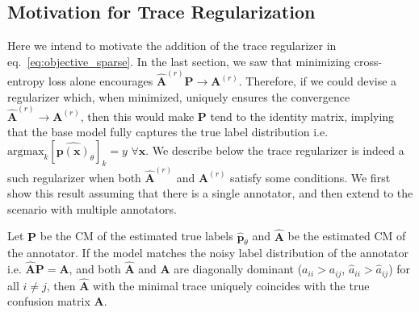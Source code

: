 \subsection{Motivation for Trace Regularization}\label{sec:theorems}
Here we intend to motivate the addition of the trace regularizer in eq.~\ref{eq:objective_sparse}. In the last section, we saw that minimizing cross-entropy loss alone encourages $\hat{\textbf{A}}^{(r)}\textbf{P}\rightarrow \textbf{A}^{(r)}$. Therefore, if we could devise a regularizer which, when minimized, uniquely ensures the convergence $\hat{\textbf{A}}^{(r)}\rightarrow\textbf{A}^{(r)}$, then this would make $\textbf{P}$ tend to the identity matrix, implying that the base model fully captures the true label distribution i.e. $\text{argmax}_{k}[\hat{\textbf{p}(\mathbf{x})}_{\theta}]_{k} =  y\,\, \forall \mathbf{x}$. We describe below the trace regularizer is indeed a such regularizer when both $\hat{\mathbf{A}}^{(r)}$ and $\mathbf{A}^{(r)}$ satisfy some conditions. We first show this result assuming that there is a single annotator, and then extend to the scenario with multiple annotators.  

\begin{lemma}
\label{lemma:1}
Let $\textbf{P}$ be the CM of the estimated true labels $\hat{\textbf{p}}_{\theta}$ and $\hat{\textbf{A}}$ be the estimated CM of the annotator. If the model matches the noisy label distribution of the annotator i.e. $\hat{\textbf{A}}\textbf{P}=\textbf{A} $, and both $\hat{\textbf{A}}$ and $\textbf{A}$ are diagonally dominant ($a_{ii} > a_{ij}$, $\hat{a}_{ii} > \hat{a}_{ij}$) for all $i \neq j$, then $\hat{\textbf{A}}$ with the minimal trace uniquely coincides with the true confusion matrix $\textbf{A}$. %
\end{lemma}

